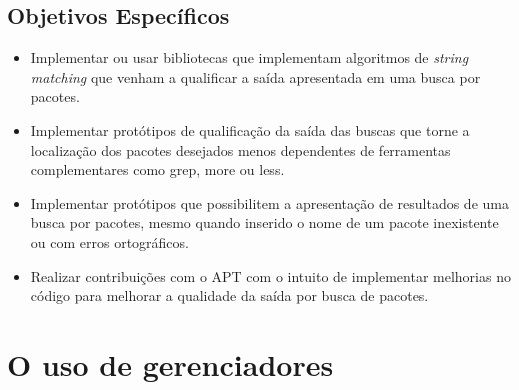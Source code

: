 \subsection*{Objetivos Específicos}



\begin{itemize}
	\item Implementar ou usar bibliotecas que implementam algoritmos de \textit{string matching} que venham a qualificar a saída apresentada em uma busca por pacotes.
	\item Implementar protótipos de qualificação da saída das buscas que torne a localização dos pacotes desejados menos dependentes de ferramentas complementares como {\code grep}, {\code more} ou {\code less}.
	\item Implementar protótipos que possibilitem a apresentação de resultados de uma busca por pacotes, mesmo quando inserido o nome de um pacote inexistente ou com erros ortográficos.
	\item Realizar contribuições com o APT com o intuito de implementar melhorias no código para melhorar a qualidade da saída por busca de pacotes.
\end{itemize}

\section*{O uso de gerenciadores} %
\label{sec:o_uso_de_gerenciadores}

